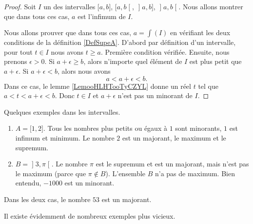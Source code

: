 \begin{proof}
	Soit \( I\) un des intervalles \( \mathopen[ a , b \mathclose]\), \( \mathopen[ a , b \mathclose[\), \( \mathopen] a , b \mathclose]\), \( \mathopen] a , b \mathclose[\). Nous allons montrer que dans tous ces cas, \( a\) est l'infimum de \( I\).

	Nous allons prouver que dans tous ces cas, \( a=\int(I)\) en vérifiant les deux conditions de la définition \ref{DefSupeA}. D'abord par définition d'un intervalle, pour tout \( t\in I\) nous avons \( t\geq a\). Première condition vérifiée. Ensuite, nous prenons \( \epsilon>0\). Si \( a+\epsilon\geq b\), alors n'importe quel élément de \( I\) est plus petit que \( a+\epsilon\). Si \( a+\epsilon<b\), alors nous avons
	\begin{equation}
		a<a+\epsilon<b.
	\end{equation}
	Dans ce cas, le lemme \ref{LemooHLHTooTyCZYL} donne un réel \( t\) tel que \( a<t<a+\epsilon<b\). Donc \( t\in I\) et \( a+\epsilon\) n'est pas un minorant de \( I\).
\end{proof}


\begin{example}
	Quelques exemples dans les intervalles.
	\begin{enumerate}
		\item
		      \( A=\mathopen[ 1 , 2 \mathclose]\). Tous les nombres plus petits ou égaux à \( 1\) sont minorants, \( 1\) est infimum et minimum. Le nombre \( 2\) est un majorant, le maximum et le supremum.
		\item
		      \( B=\mathopen] 3 , \pi \mathclose[\). Le nombre \( \pi\) est le supremum et est un majorant, mais n'est pas le maximum (parce que \( \pi\notin B\)). L'ensemble \( B\) n'a pas de maximum. Bien entendu, \( -1000\) est un minorant.
	\end{enumerate}
	Dans les deux cas, le nombre \( 53\) est un majorant.
\end{example}

Il existe évidemment de nombreux exemples plus vicieux.

